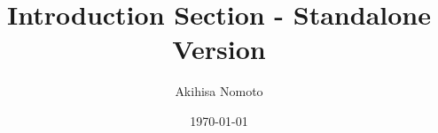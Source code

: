 \documentclass[11pt]{article}
\begin{document}
\title{Introduction Section - Standalone Version}
\author{Akihisa Nomoto}
\date{\today}
\maketitle





\end{document}
